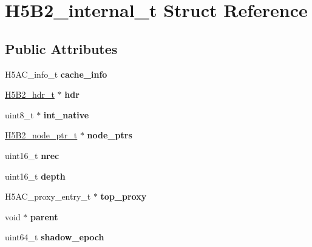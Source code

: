 \hypertarget{struct_h5_b2__internal__t}{}\section{H5\+B2\+\_\+internal\+\_\+t Struct Reference}
\label{struct_h5_b2__internal__t}
\subsection*{Public Attributes}
\begin{DoxyCompactItemize}
\item 
\mbox{\label{struct_h5_b2__internal__t_a1bdaaabc11e739701fd7f190b5ff5bb9}} 
H5\+A\+C\+\_\+info\+\_\+t {\bfseries cache\+\_\+info}
\item 
\mbox{\label{struct_h5_b2__internal__t_a3fe6b8ed4296348fca4a376a4bd2cb7e}} 
\hyperlink{struct_h5_b2__hdr__t}{H5\+B2\+\_\+hdr\+\_\+t} $\ast$ {\bfseries hdr}
\item 
\mbox{\label{struct_h5_b2__internal__t_a796a9a799b7d0431fb49ec279e03ae2d}} 
uint8\+\_\+t $\ast$ {\bfseries int\+\_\+native}
\item 
\mbox{\label{struct_h5_b2__internal__t_af145bea9ef936c9aa89cf4d83205034b}} 
\hyperlink{struct_h5_b2__node__ptr__t}{H5\+B2\+\_\+node\+\_\+ptr\+\_\+t} $\ast$ {\bfseries node\+\_\+ptrs}
\item 
\mbox{\label{struct_h5_b2__internal__t_ab10c81bb32f978807f9b56304712a176}} 
uint16\+\_\+t {\bfseries nrec}
\item 
\mbox{\label{struct_h5_b2__internal__t_a53bea188e060dd72e55bbf8237811d43}} 
uint16\+\_\+t {\bfseries depth}
\item 
\mbox{\label{struct_h5_b2__internal__t_aeebad593173547be8c2e26be45cfdd3a}} 
H5\+A\+C\+\_\+proxy\+\_\+entry\+\_\+t $\ast$ {\bfseries top\+\_\+proxy}
\item 
\mbox{\label{struct_h5_b2__internal__t_a0a41c122371a8d279e17413ceba6fd5c}} 
void $\ast$ {\bfseries parent}
\item 
\mbox{\label{struct_h5_b2__internal__t_ab198f2b2c5202c95045da5e3c86909f2}} 
uint64\+\_\+t {\bfseries shadow\+\_\+epoch}
\end{DoxyCompactItemize}



